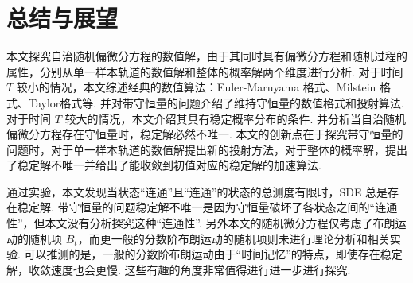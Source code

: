 \chapter{总结与展望}\label{chap7}


本文探究自治随机偏微分方程的数值解，由于其同时具有偏微分方程和随机过程的属性，分别从单一样本轨道的数值解和整体的概率解两个维度进行分析. 
对于时间 $T$ 较小的情况，本文综述经典的数值算法：Euler-Maruyama 格式、Milstein 格式、Taylor格式等. 并对带守恒量的问题介绍了维持守恒量的数值格式和投射算法. 
对于时间 $T$ 较大的情况，本文介绍其具有稳定概率分布的条件. 并分析当自治随机偏微分方程存在守恒量时，稳定解必然不唯一. 
本文的创新点在于探究带守恒量的问题时，对于单一样本轨道的数值解提出新的投射方法，对于整体的概率解，提出了稳定解不唯一并给出了能收敛到初值对应的稳定解的加速算法. 

通过实验，本文发现当状态“连通”且“连通”的状态的总测度有限时，SDE 总是存在稳定解. 带守恒量的问题稳定解不唯一是因为守恒量破坏了各状态之间的“连通性”，但本文没有分析探究这种“连通性”. 
另外本文的随机微分方程仅考虑了布朗运动的随机项 $B_t$，而更一般的分数阶布朗运动的随机项则未进行理论分析和相关实验. 可以推测的是，一般的分数阶布朗运动由于“时间记忆”的特点，即使存在稳定解，收敛速度也会更慢. 
这些有趣的角度非常值得进行进一步进行探究. 




